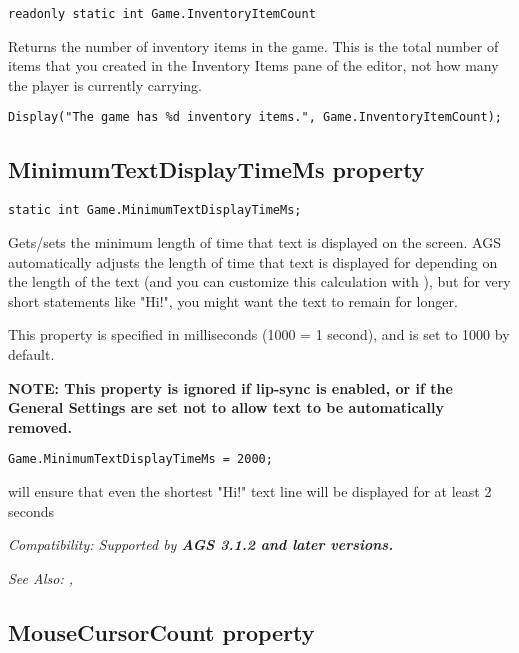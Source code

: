 \begin{verbatim}
readonly static int Game.InventoryItemCount
\end{verbatim}
Returns the number of inventory items in the game. This is the total number of items that you
created in the Inventory Items pane of the editor, not how many the player is currently carrying.

\begin{verbatim}
Display("The game has %d inventory items.", Game.InventoryItemCount);
\end{verbatim}


\subsection{MinimumTextDisplayTimeMs property}\label{Game.MinimumTextDisplayTimeMs}%

\begin{verbatim}
static int Game.MinimumTextDisplayTimeMs;
\end{verbatim}
Gets/sets the minimum length of time that text is displayed on the screen. AGS automatically
adjusts the length of time that text is displayed for depending on the length of the text
(and you can customize this calculation with ),
but for very short statements like "Hi!", you might want the text to remain for longer.

This property is specified in milliseconds (1000 = 1 second), and is set to 1000 by default.

\bf{NOTE:} This property is ignored if lip-sync is enabled, or if the General Settings
are set not to allow text to be automatically removed.

\begin{verbatim}
Game.MinimumTextDisplayTimeMs = 2000;
\end{verbatim}
will ensure that even the shortest "Hi!" text line will be displayed for at least 2 seconds

\it{Compatibility:} Supported by \bf{AGS 3.1.2} and later versions.

\it{See Also:} ,


\subsection{MouseCursorCount property}\label{Game.MouseCursorCount}%

